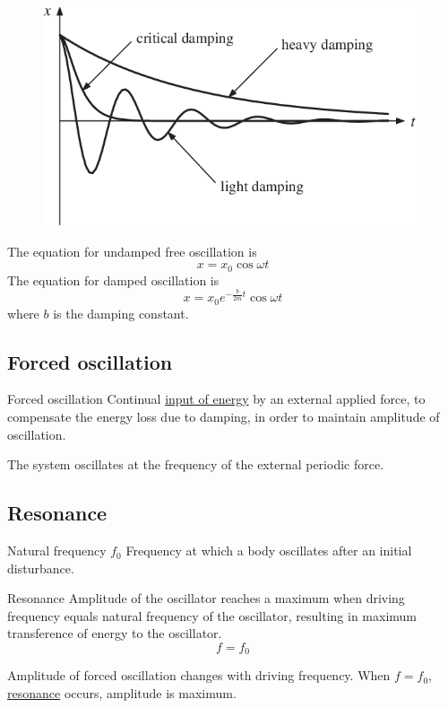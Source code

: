 \begin{figure}[H]
    \centering
    \includegraphics[width=11cm]{images/Damping.png}
\end{figure}

The equation for undamped free oscillation is 
\[ x=x_0\cos\omega t \]
The equation for damped oscillation is 
\[ x=x_0e^{-\frac{b}{2m}t}\cos\omega t \]
where $b$ is the damping constant.
\pagebreak

\subsection{Forced oscillation}
\begin{defn}{Forced oscillation}{}
Continual \underline{input of energy} by an external applied force, to compensate the energy loss due to damping, in order to maintain amplitude of oscillation.

The system oscillates at the frequency of the external periodic force.
\end{defn}

\subsection{Resonance}
\begin{defn}{Natural frequency $f_0$}{}
Frequency at which a body oscillates after an initial disturbance. 
\end{defn}

\begin{defn}{Resonance}{}
Amplitude of the oscillator reaches a maximum when driving frequency equals natural frequency of the oscillator, resulting in maximum transference of energy to the oscillator.
\[ f=f_0 \]
\end{defn}

Amplitude of forced oscillation changes with driving frequency. When $f=f_0$, \underline{resonance} occurs, amplitude is maximum.

